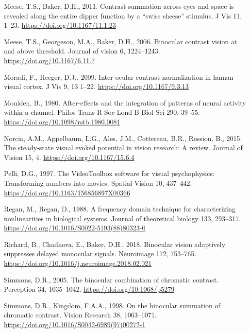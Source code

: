 \documentclass[
  12pt,
]{article}
\newlength{\cslhangindent}
\newenvironment{CSLReferences}[2] %
 {\begin{list}{}{%
  \setlength{\itemindent}{0pt}
  \setlength{\leftmargin}{0pt}
  \setlength{\parsep}{0pt}
  \ifodd #1
   \setlength{\leftmargin}{\cslhangindent}
   \setlength{\itemindent}{-1\cslhangindent}
  \fi
  \setlength{\itemsep}{#2\baselineskip}}}
 {\end{list}}
\begin{document}
\begin{CSLReferences}{1}{0}
Meese, T.S., Baker, D.H., 2011. Contrast summation across eyes and space
is revealed along the entire dipper function by a {``swiss cheese''}
stimulus. J Vis 11, 1--23. \url{https://doi.org/10.1167/11.1.23}

Meese, T.S., Georgeson, M.A., Baker, D.H., 2006. Binocular contrast
vision at and above threshold. Journal of vision 6, 1224--1243.
\url{https://doi.org/10.1167/6.11.7}

Moradi, F., Heeger, D.J., 2009. Inter-ocular contrast normalization in
human visual cortex. J Vis 9, 13 1--22.
\url{https://doi.org/10.1167/9.3.13}

Moulden, B., 1980. After-effects and the integration of patterns of
neural activity within a channel. Philos Trans R Soc Lond B Biol Sci
290, 39--55. \url{https://doi.org/10.1098/rstb.1980.0081}

Norcia, A.M., Appelbaum, L.G., Ales, J.M., Cottereau, B.R., Rossion, B.,
2015. The steady-state visual evoked potential in vision research: A
review. Journal of Vision 15, 4. \url{https://doi.org/10.1167/15.6.4}

Pelli, D.G., 1997. The VideoToolbox software for visual psychophysics:
Transforming numbers into movies. Spatial Vision 10, 437--442.
\url{https://doi.org/10.1163/156856897X00366}

Regan, M., Regan, D., 1988. A frequency domain technique for
characterizing nonlinearities in biological systems. Journal of
theoretical biology 133, 293--317.
\url{https://doi.org/10.1016/S0022-5193(88)80323-0}

Richard, B., Chadnova, E., Baker, D.H., 2018. Binocular vision
adaptively suppresses delayed monocular signals. Neuroimage 172,
753--765. \url{https://doi.org/10.1016/j.neuroimage.2018.02.021}

Simmons, D.R., 2005. The binocular combination of chromatic contrast.
Perception 34, 1035--1042. \url{https://doi.org/10.1068/p5279}

Simmons, D.R., Kingdom, F.A.A., 1998. On the binocular summation of
chromatic contrast. Vision Research 38, 1063--1071.
\url{https://doi.org/10.1016/S0042-6989(97)00272-1}


\end{CSLReferences}
\end{document}
